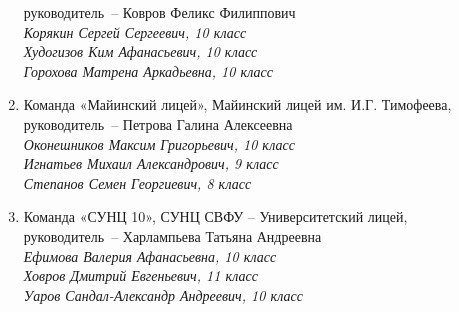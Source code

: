 \begin{enumerate}
руководитель~– Ковров Феликс Филиппович\\
\it
\indent Корякин Сергей Сергеевич, 10 класс\\
\indent Худогизов Ким Афанасьевич, 10 класс\\
\indent Горохова Матрена Аркадьевна, 10 класс
\rm
\item
Команда «Майинский лицей», Майинский лицей им. И.Г. Тимофеева, \\
руководитель~– Петрова Галина Алексеевна\\
\it
\indent Оконешников Максим Григорьевич, 10 класс\\
\indent Игнатьев Михаил Александрович, 9 класс\\
\indent Степанов Семен Георгиевич, 8 класс
\rm
\item
Команда «СУНЦ 10», СУНЦ СВФУ – Университетский лицей,\\
руководитель~– Харлампьева Татьяна Андреевна\\
\it
\indent Ефимова Валерия Афанасьевна, 10 класс\\
\indent Ховров Дмитрий Евгеньевич, 11 класс\\
\indent Уаров Сандал-Александр Андреевич, 10 класс
\rm
\end{enumerate}